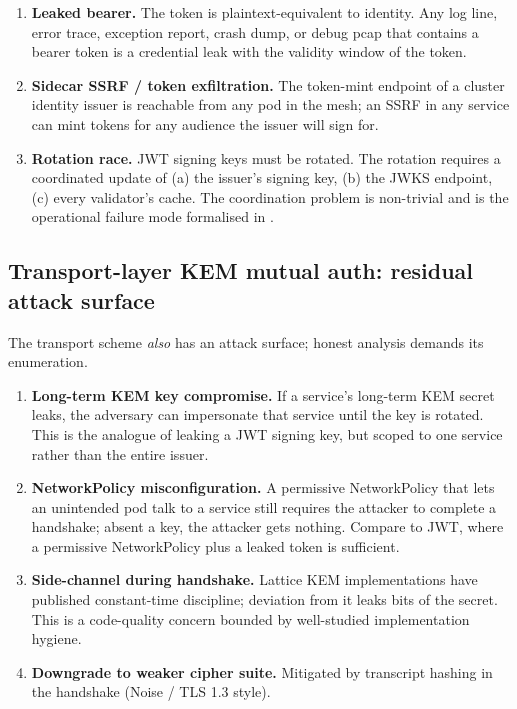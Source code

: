 \documentclass[11pt,a4paper]{article}
\theoremstyle{plain}
\theoremstyle{definition}
\begin{document}
\begin{enumerate}[itemsep=2pt,topsep=2pt]
        the gap is the bound) or a stateful blacklist (in which case the
        statelessness benefit is lost).
  \item \textbf{Leaked bearer.} The token is plaintext-equivalent to
        identity. Any log line, error trace, exception report,
        crash dump, or debug pcap that contains a bearer token is a
        credential leak with the validity window of the token.
  \item \textbf{Sidecar SSRF / token exfiltration.} The token-mint endpoint
        of a cluster identity issuer is reachable from any pod in the mesh;
        an SSRF in any service can mint tokens for any audience the issuer
        will sign for.
  \item \textbf{Rotation race.} JWT signing keys must be rotated. The
        rotation requires a coordinated update of (a) the issuer's signing
        key, (b) the JWKS endpoint, (c) every validator's cache. The
        coordination problem is non-trivial and is the operational
        failure mode formalised in .
\end{enumerate}

\subsection{Transport-layer KEM mutual auth: residual attack surface}
\label{sec:zap-tm}

The transport scheme \emph{also} has an attack surface; honest analysis
demands its enumeration.

\begin{enumerate}[itemsep=2pt,topsep=2pt]
  \item \textbf{Long-term KEM key compromise.} If a service's long-term KEM
        secret leaks, the adversary can impersonate that service until the
        key is rotated. This is the analogue of leaking a JWT signing key,
        but scoped to one service rather than the entire issuer.
  \item \textbf{NetworkPolicy misconfiguration.} A permissive
        NetworkPolicy that lets an unintended pod talk to a service still
        requires the attacker to complete a handshake; absent a key, the
        attacker gets nothing. Compare to JWT, where a permissive
        NetworkPolicy plus a leaked token is sufficient.
  \item \textbf{Side-channel during handshake.} Lattice KEM
        implementations have published constant-time discipline; deviation
        from it leaks bits of the secret. This is a code-quality concern
        bounded by well-studied implementation hygiene.
  \item \textbf{Downgrade to weaker cipher suite.} Mitigated by transcript
        hashing in the handshake (Noise / TLS 1.3 style).
\end{enumerate}
\end{document}

